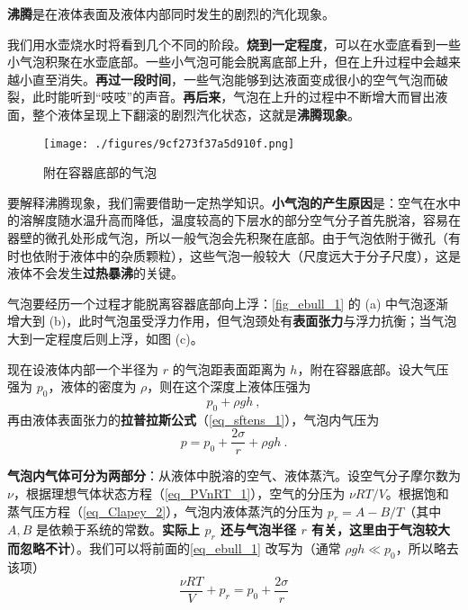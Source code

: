 
\textbf{沸腾}是在液体表面及液体内部同时发生的剧烈的汽化现象。

我们用水壶烧水时将看到几个不同的阶段。\textbf{烧到一定程度}，可以在水壶底看到一些小气泡积聚在水壶底部。一些小气泡可能会脱离底部上升，但在上升过程中会越来越小直至消失。\textbf{再过一段时间}，一些气泡能够到达液面变成很小的空气气泡而破裂，此时能听到“吱吱”的声音。\textbf{再后来}，气泡在上升的过程中不断增大而冒出液面，整个液体呈现上下翻滚的剧烈汽化状态，这就是\textbf{沸腾现象}。
\begin{figure}[ht]
\centering
\texttt{[image: ./figures/9cf273f37a5d910f.png]}
\caption{附在容器底部的气泡} \label{fig_ebull_1}
\end{figure}
要解释沸腾现象，我们需要借助一定热学知识。\textbf{小气泡的产生原因}是：空气在水中的溶解度随水温升高而降低，温度较高的下层水的部分空气分子首先脱溶，容易在器壁的微孔处形成气泡，所以一般气泡会先积聚在底部。由于气泡依附于微孔（有时也依附于液体中的杂质颗粒），这些气泡一般较大（尺度远大于分子尺度），这是液体不会发生\textbf{过热暴沸}的关键。

气泡要经历一个过程才能脱离容器底部向上浮：\autoref{fig_ebull_1} 的 (a) 中气泡逐渐增大到 (b)，此时气泡虽受浮力作用，但气泡颈处有\textbf{表面张力}与浮力抗衡；当气泡大到一定程度后则上浮，如图 (c)。

现在设液体内部一个半径为 $r$ 的气泡距表面距离为 $h$，附在容器底部。设大气压强为 $p_0$，液体的密度为 $\rho$，则在这个深度上液体压强为
\begin{equation}
p_0+\rho gh ~,
\end{equation}
再由液体表面张力的\textbf{拉普拉斯公式}（\autoref{eq_sftens_1}），气泡内气压为
\begin{equation}\label{eq_ebull_1}
p=p_0+\frac{2\sigma}{r}+\rho gh~.
\end{equation}

\textbf{气泡内气体可分为两部分}：从液体中脱溶的空气、液体蒸汽。设空气分子摩尔数为 $\nu$，根据理想气体状态方程（\autoref{eq_PVnRT_1}），空气的分压为 $\nu RT/V$。根据饱和蒸气压方程（\autoref{eq_Clapey_2}），气泡内液体蒸汽的分压为 $p_r=A-B/T$（其中 $A,B$ 是依赖于系统的常数。\textbf{实际上 $p_r$ 还与气泡半径 $r$ 有关，这里由于气泡较大而忽略不计}）。我们可以将前面的\autoref{eq_ebull_1} 改写为（通常 $\rho gh\ll p_0$，所以略去该项）
\begin{equation}\label{eq_ebull_2}
\frac{\nu RT}{V}+p_r=p_0+\frac{2\sigma}{r}
\end{equation}

